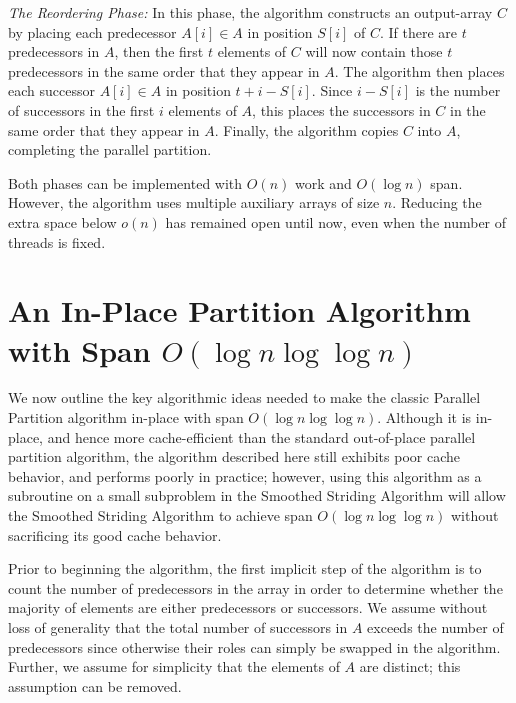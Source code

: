 \documentclass[sigconf]{acmart}
\renewcommand{\paragraph}[1]{\vspace{0.09in}\noindent{\bf \boldmath #1.}}
\theoremstyle{remark}
\theoremstyle{remark}
\begin{document}
\noindent\emph{The Reordering Phase: }In this phase, the algorithm constructs
an output-array $C$ by placing each predecessor $A[i] \in A$ in position $S[i]$
of $C$. If there are $t$ predecessors in $A$, then the first $t$ elements of
$C$ will now contain those $t$ predecessors in the same order that they appear
in $A$. The algorithm then places each successor $A[i] \in A$ in position $t +
i - S[i]$. Since $i - S[i]$ is the number of successors in the first $i$
elements of $A$, this places the successors in $C$ in the same order that they
appear in $A$. Finally, the algorithm copies $C$ into $A$, completing the
parallel partition.

Both phases can be implemented with $O(n)$ work and $O(\log n)$
span. However, the algorithm uses multiple auxiliary arrays of size $n$.
Reducing the extra space below $o(n)$ has remained open until now, even when
the number of threads is fixed.

\section{An In-Place Partition Algorithm \\with Span $O(\log n \log \log
n)$}\label{sec:prefixbasedalg} We now outline the key algorithmic ideas needed
to make the classic Parallel Partition algorithm in-place with span $O(\log n
\log \log n)$. Although it is in-place, and hence more cache-efficient than the
standard out-of-place parallel partition algorithm, the algorithm described
here still exhibits poor cache behavior, and performs poorly in practice;
however, using this algorithm as a subroutine on a small subproblem in the
Smoothed Striding Algorithm will allow the Smoothed Striding Algorithm to
achieve span $O(\log n \log \log n)$ without sacrificing its good cache behavior.

\paragraph{Algorithm Outline}
Prior to beginning the algorithm, the first implicit step of the
algorithm is to count the number of predecessors in the array in
order to determine whether the majority of elements are either
predecessors or successors. We assume without loss of generality that the total
number of successors in $A$ exceeds the number of predecessors since otherwise
their roles can simply be swapped in the algorithm. Further, we assume for
simplicity that the elements of $A$ are distinct; this assumption can be removed.
\end{document}

